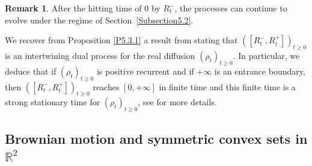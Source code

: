 \documentclass[10pt]{amsart}
\theoremstyle{plain}
\theoremstyle{definition}
\newtheorem{remark}[thm]{Remark}
\newcommand{\RR}{{\mathbb R}}
\let\iy\infty
\begin{document}
\begin{remark}
\label{R5.3.1}
After the hitting time of $0$ by $R_t^-$, the processes can continue to evolve under the regime of Section~\ref{Subsection5.2}.
\end{remark}

We recover from Proposition \ref{P5.3.1} a result from \cite{MR3634282} stating that $([R^-_t,R^+_t])_{t\geq 0}$ is an intertwining dual process for the real diffusion $(\rho_t)_{t\geq 0}$.
In particular, we deduce that if $(\rho_t)_{t\geq 0}$ is positive recurrent and if $+\iy$ is an entrance boundary, then $([R^-_t,R^+_t])_{t\geq 0}$ reaches $[0,+\iy]$ in finite time and this finite time is a strong stationary time for $(\rho_t)_{t\geq 0}$, see \cite{MR3634282} for more details.

\subsection{Brownian motion and symmetric convex sets in $\RR^2$}
\label{Subsection5.4}
\end{document}
